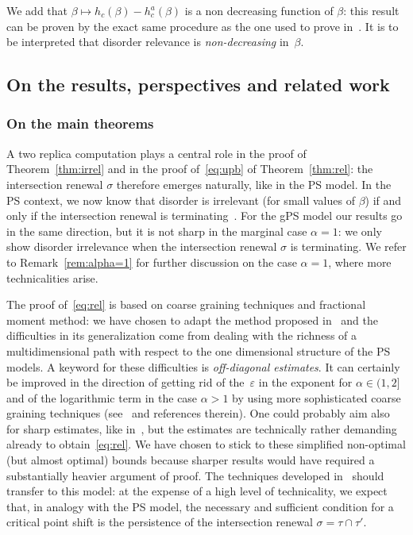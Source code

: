\documentclass[11pt]{article}
\theoremstyle{definition}
\numberwithin{equation}{section}
\numberwithin{figure}{section}
\numberwithin{table}{section}
\newcommand{\ga}{\alpha}
\newcommand{\gb}{\beta}
\newcommand{\gep}{\varepsilon}
\begin{document}
We add that $\gb\mapsto h_c(\gb)-h_c^{a}(\gb)$ is a non decreasing function of $\beta$: this result can be proven by the exact same procedure as the one used to prove in~\cite[Proposition~6.1]{cf:GLT11}. It is to be interpreted that disorder relevance is \emph{non-decreasing} in~$\beta$.

\subsection{On the results, perspectives and related work}\label{sec:misc}

\subsubsection{On the main theorems}

A two replica computation plays a central role in the proof of Theorem~\ref{thm:irrel} and in the proof of~\eqref{eq:upb} of Theorem~\ref{thm:rel}: the intersection renewal $\sigma$ therefore emerges naturally, like in the PS model. In the PS context, we now know that disorder is irrelevant (for small values of $\gb$) if and only if the intersection renewal is terminating~\cite{cf:BL16}. For the gPS model our results go in the same direction, but it is not sharp in the marginal case $\ga=1$: we only show disorder irrelevance when the intersection renewal $\sigma$ is terminating. We refer to Remark~\ref{rem:alpha=1} for further discussion on the case $\ga=1$, where more technicalities arise.

The proof of~\eqref{eq:rel} is based on coarse graining techniques and fractional moment method: we have chosen to adapt the method proposed in~\cite{cf:DGLT09} and the difficulties in its generalization come from dealing with the richness of a multidimensional path with respect to the one dimensional structure of the PS models. A keyword for these difficulties is \emph{off-diagonal estimates}. It can certainly be improved in the direction of getting rid of the~$\gep$ in the exponent for $\ga \in (1, 2]$ and of the logarithmic term in the case $\ga >1$ by using more sophisticated coarse graining techniques (see~\cite[Chapter~6]{cf:G} and references therein). One could probably aim also for sharp estimates, like in~\cite{cf:BL16}, but the estimates are technically rather demanding already to obtain~\eqref{eq:rel}. We have chosen to stick to these simplified non-optimal (but almost optimal) bounds because sharper results would have required a substantially heavier argument of proof. The techniques developed in~\cite{cf:BL16bis,cf:BL16} should transfer to this model: at the expense of a high level of technicality, we expect that, in analogy with the PS model, the necessary and sufficient condition for a critical point shift is the persistence of the intersection renewal $\sigma=\tau\cap\tau'$.
\end{document}
